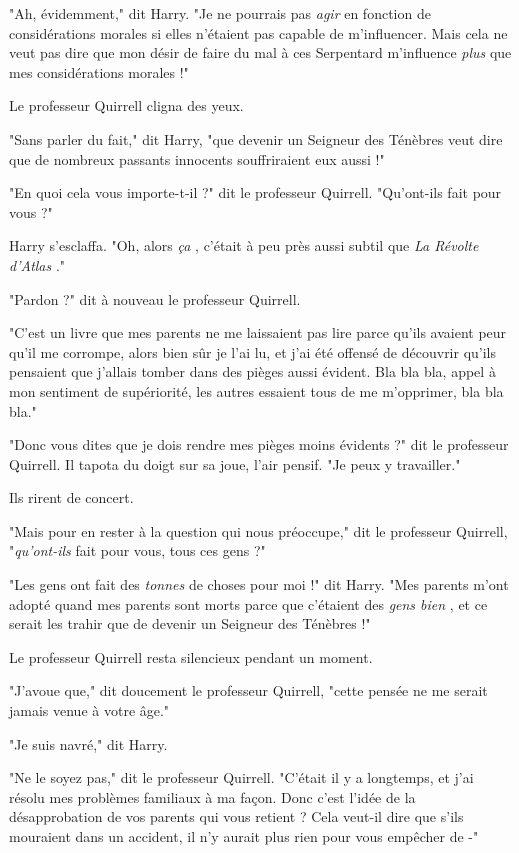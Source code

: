 "Ah, évidemment," dit Harry. "Je ne pourrais pas \emph{agir}  en fonction de considérations morales si elles n'étaient pas capable de m'influencer. Mais cela ne veut pas dire que mon désir de faire du mal à ces Serpentard m'influence \emph{plus}  que mes considérations morales !"

Le professeur Quirrell cligna des yeux.

"Sans parler du fait," dit Harry, "que devenir un Seigneur des Ténèbres veut dire que de nombreux passants innocents souffriraient eux aussi !"

"En quoi cela vous importe-t-il ?" dit le professeur Quirrell. "Qu'ont-ils fait pour vous ?"

Harry s'esclaffa. "Oh, alors \emph{ça} , c'était à peu près aussi subtil que \emph{La Révolte d'Atlas} ."

"Pardon ?" dit à nouveau le professeur Quirrell.

"C'est un livre que mes parents ne me laissaient pas lire parce qu'ils avaient peur qu'il me corrompe, alors bien sûr je l'ai lu, et j'ai été offensé de découvrir qu'ils pensaient que j'allais tomber dans des pièges aussi évident. Bla bla bla, appel à mon sentiment de supériorité, les autres essaient tous de me m'opprimer, bla bla bla."

"Donc vous dites que je dois rendre mes pièges moins évidents ?" dit le professeur Quirrell. Il tapota du doigt sur sa joue, l'air pensif. "Je peux y travailler."

Ils rirent de concert.

"Mais pour en rester à la question qui nous préoccupe," dit le professeur Quirrell, "\emph{qu'ont-ils}  fait pour vous, tous ces gens ?"

"Les gens ont fait des \emph{tonnes}  de choses pour moi !" dit Harry. "Mes parents m'ont adopté quand mes parents sont morts parce que c'étaient des \emph{gens bien} , et ce serait les trahir que de devenir un Seigneur des Ténèbres !"

Le professeur Quirrell resta silencieux pendant un moment.

"J'avoue que," dit doucement le professeur Quirrell, "cette pensée ne me serait jamais venue à votre âge."

"Je suis navré," dit Harry.

"Ne le soyez pas," dit le professeur Quirrell. "C'était il y a longtemps, et j'ai résolu mes problèmes familiaux à ma façon. Donc c'est l'idée de la désapprobation de vos parents qui vous retient ? Cela veut-il dire que s'ils mouraient dans un accident, il n'y aurait plus rien pour vous empêcher de -"

